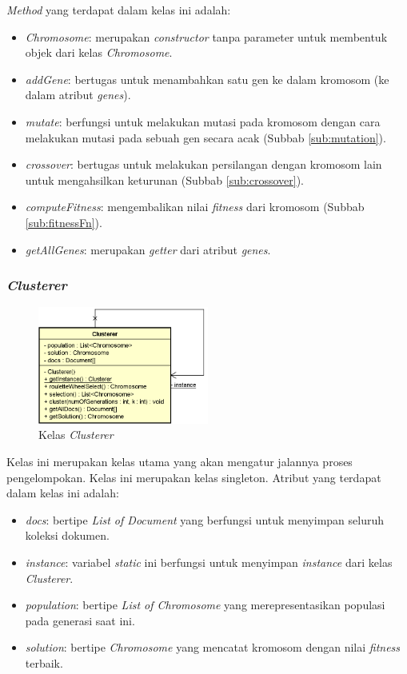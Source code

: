 \documentclass[a4paper,twoside]{article}
\begin{document}
\begin{enumerate}
\textit{Method} yang terdapat dalam kelas ini adalah:

\begin{itemize}
	\item \textit{Chromosome}: merupakan \textit{constructor} tanpa parameter untuk membentuk objek dari kelas \textit{Chromosome}.
	\item \textit{addGene}: bertugas untuk menambahkan satu gen ke dalam kromosom (ke dalam atribut \textit{genes}).
	\item \textit{mutate}: berfungsi untuk melakukan mutasi pada kromosom dengan cara melakukan mutasi pada sebuah gen secara acak (Subbab \ref{sub:mutation}).
	\item \textit{crossover}: bertugas untuk melakukan persilangan dengan kromosom lain untuk mengahsilkan keturunan (Subbab \ref{sub:crossover}).
	\item \textit{computeFitness}: mengembalikan nilai \textit{fitness} dari kromosom (Subbab \ref{sub:fitnessFn}).
	\item \textit{getAllGenes}: merupakan \textit{getter} dari atribut \textit{genes}.
\end{itemize}

\subsubsection*{\textit{Clusterer}}

\begin{figure}[h]
	\begin{center}
		\includegraphics[width=0.5\textwidth]{DiagramKelas/Clusterer}
		\caption{Kelas \textit{Clusterer}}
		\label{fig:kelasClusterer}
	\end{center}
\end{figure}

Kelas ini merupakan kelas utama yang akan mengatur jalannya proses pengelompokan. Kelas ini merupakan kelas singleton. Atribut yang terdapat dalam kelas ini adalah:

\begin{itemize}
	\item \textit{docs}: bertipe \textit{List of Document} yang berfungsi untuk menyimpan seluruh koleksi dokumen.
	\item \textit{instance}: variabel \textit{static} ini berfungsi untuk menyimpan \textit{instance} dari kelas \textit{Clusterer}.
	\item \textit{population}: bertipe \textit{List of Chromosome} yang merepresentasikan populasi pada generasi saat ini.
	\item \textit{solution}: bertipe \textit{Chromosome} yang mencatat kromosom dengan nilai \textit{fitness} terbaik.
\end{itemize}


\end{enumerate}
\end{document}
